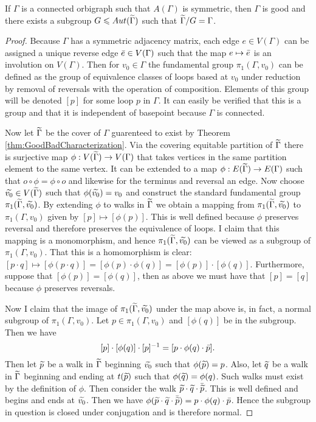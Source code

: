 \begin{theorem}
  If $\Gamma$ is a connected orbigraph such that $A(\Gamma)$ is symmetric, then $\Gamma$ is good and there exists a subgroup $G \leqslant Aut(\widetilde{\Gamma})$ such that $\widetilde{\Gamma} / G = \Gamma$.
\end{theorem}
\begin{proof}
  Because $\Gamma$ has a symmetric adjacency matrix, each edge $e \in V(\Gamma)$ can be assigned a unique reverse edge $\bar{e} \in V(\Gamma)$ such that the map $e \mapsto \bar{e}$ is an involution on $V(\Gamma)$. Then for $v_0 \in \Gamma$ the fundamental group $\pi_1(\Gamma, v_0)$ can be defined as the group of equivalence classes of loops based at $v_0$ under reduction by removal of reversals with the operation of composition. Elements of this group will be denoted $[p]$ for some loop $p$ in $\Gamma$. It can easily be verified that this is a group and that it is independent of basepoint because $\Gamma$ is connected.

  Now let $\widetilde{\Gamma}$ be the cover of $\Gamma$ guarenteed to exist by Theorem \ref{thm:GoodBadCharacterization}. Via the covering equitable partition of $\widetilde{\Gamma}$ there is surjective map $\phi : V(\widetilde{\Gamma}) \to V(\Gamma)$ that takes vertices in the same partition element to the same vertex. It can be extended to a map $\phi: E(\widetilde{\Gamma}) \to E(\Gamma)$ such that $o \circ \phi = \phi \circ o$ and likewise for the terminus and reversal an edge. Now choose $\widetilde{v_0} \in V(\widetilde{\Gamma})$ such that $\phi(\widetilde{v_0}) = v_0$ and construct the standard fundamental group $\pi_1(\widetilde{\Gamma}, \widetilde{v_0})$. By extending $\phi$ to walks in $\widetilde{\Gamma}$ we obtain a mapping from $\pi_1(\widetilde{\Gamma}, \widetilde{v_0})$ to $\pi_1(\Gamma, v_0)$ given by $[p] \mapsto [\phi(p)]$. This is well defined because $\phi$ preserves reversal and therefore preserves the equivalence of loops. I claim that this mapping is a monomorphism, and hence $\pi_1(\widetilde{\Gamma}, \widetilde{v_0})$ can be viewed as a subgroup of $\pi_1(\Gamma, v_0)$. That this is a homomorphism is clear: $[p \cdot q] \mapsto [\phi(p \cdot q)] = [\phi(p) \cdot \phi(q)] = [\phi(p)] \cdot [\phi(q)]$. Furthermore, suppose that $[\phi(p)] = [\phi(q)]$, then as above we must have that $[p] = [q]$ because $\phi$ preserves reversals. 

  Now I claim that the image of $\pi_1(\widetilde{\Gamma}, \widetilde{v_0})$ under the map above is, in fact, a normal subgroup of $\pi_1(\Gamma, v_0)$. Let $p \in \pi_1(\Gamma, v_0)$ and $[\phi(q)]$ be in the subgroup. Then we have
  $$
    [p] \cdot [\phi(q)] \cdot [p]^{-1} = [p \cdot \phi(q) \cdot \bar{p}].
  $$
  Then let $\widetilde{p}$ be a walk in $\widetilde{\Gamma}$ beginning $\widetilde{v_0}$ such that $\phi(\widetilde{p}) = p$. Also, let $\widetilde{q}$ be a walk in $\widetilde{\Gamma}$ beginning and ending at $t(\widetilde{p})$ such that $\phi(\widetilde{q}) = \phi(q)$. Such walks must exist by the definition of $\phi$. Then consider the walk $\widetilde{p} \cdot \widetilde{q} \cdot \bar{\widetilde{p}}$. This is well defined and begins and ends at $\widetilde{v_0}$. Then we have $\phi(\widetilde{p} \cdot \widetilde{q} \cdot \bar{\widetilde{p}}) = p \cdot \phi(q) \cdot \bar{p}$. Hence the subgroup in question is closed under conjugation and is therefore normal. 


\end{proof}

